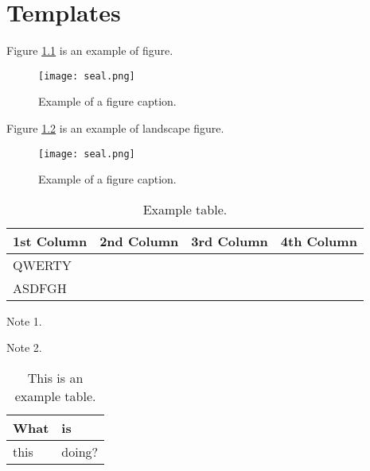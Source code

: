 \chapter{Templates}


\begin{tempsection}
    Figure \ref{fig} is an example of figure.
    \begin{figure}[htbp]
        \centerline{\texttt{[image: seal.png]}}
        \caption{Example of a figure caption.}
        \label{fig}
    \end{figure}

    Figure \ref{fig2} is an example of landscape figure.
    \begin{landscape}
    \begin{figure}[htbp]
        \centerline{\texttt{[image: seal.png]}}
        \caption{Example of a figure caption.}
        \label{fig2}
    \end{figure}
    \end{landscape}

    \begin{table}[htbp]
        \begin{center}
        \begin{threeparttable}
        \caption{Example table.\label{tab}}
        \centering
            \begin{tabular}{l c c c}
                \toprule
                    \textbf{1st Column} & \textbf{2nd Column} & \textbf{3rd Column} & \textbf{4th Column} \\ 
                \midrule
                    QWERTY\tnote{1}   &                     &                     &  \\
                    ASDFGH\tnote{2}   &                     &                     &  \\ 
                \bottomrule
            \end{tabular}
            \begin{tablenotes}
                \item [1] Note 1. 
                \item [2] Note 2.
            \end{tablenotes}
        \end{threeparttable}
    \end{center}
    \end{table}

    \begingroup
    \begin{table}
        \centering
        \caption{This is an example table.}\label{tbl:nicetablelesstable}
        \begin{tabular}{ll}
            What & is     \\
            \hline
            this & doing? \\
        \end{tabular}
    \end{table}
    \endgroup


\end{tempsection}

